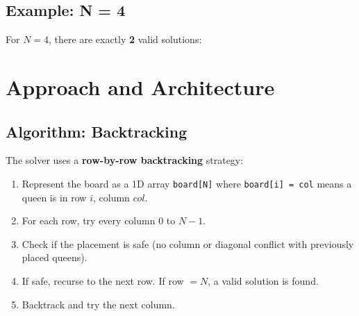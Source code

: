 \documentclass[11pt]{article}
\begin{document}
\subsection{Example: N = 4}

For $N = 4$, there are exactly \textbf{2} valid solutions:

\begin{center}
\end{center}

\section{Approach and Architecture}

\subsection{Algorithm: Backtracking}

The solver uses a \textbf{row-by-row backtracking} strategy:

\begin{enumerate}
    \item Represent the board as a 1D array \texttt{board[N]} where \texttt{board[i] = col} means a queen is in row $i$, column $col$.
    \item For each row, try every column $0$ to $N-1$.
    \item Check if the placement is safe (no column or diagonal conflict with previously placed queens).
    \item If safe, recurse to the next row. If row $= N$, a valid solution is found.
    \item Backtrack and try the next column.
\end{enumerate}
\end{document}
